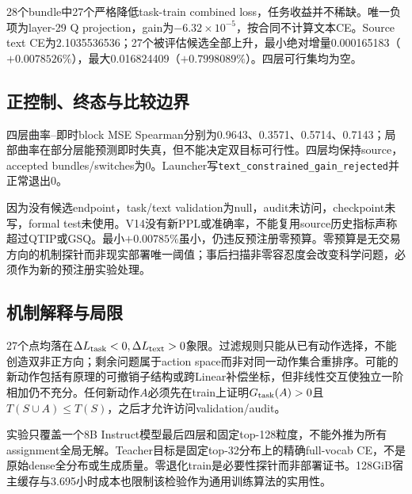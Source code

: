 28个bundle中27个严格降低task-train combined loss，任务收益并不稀缺。唯一负项为layer-29 Q projection，gain为$-6.32\times10^{-5}$，按合同不计算文本CE。Source text CE为2.1035536536；27个被评估候选全部上升，最小绝对增量0.000165183（$+0.0078526\%$），最大0.016824409（$+0.7998089\%$）。四层可行集均为空。

\subsection{正控制、终态与比较边界}

四层曲率--即时block MSE Spearman分别为0.9643、0.3571、0.5714、0.7143；局部曲率在部分层能预测即时失真，但不能决定双目标可行性。四层均保持source，accepted bundles/switches为0。Launcher写\texttt{text\_constrained\_gain\_rejected}并正常退出0。

因为没有候选endpoint，task/text validation为null，audit未访问，checkpoint未写，formal test未使用。V14没有新PPL或准确率，不能复用source历史指标声称超过QTIP或GSQ。最小$+0.00785\%$虽小，仍违反预注册零预算。零预算是无交易方向的机制探针而非现实部署唯一阈值；事后扫描非零容忍度会改变科学问题，必须作为新的预注册实验处理。

\subsection{机制解释与局限}

27个点均落在$\Delta L_{\rm task}<0,\Delta L_{\rm text}>0$象限。过滤规则只能从已有动作选择，不能创造双非正方向；剩余问题属于action space而非对同一动作集合重排序。可能的新动作包括有原理的可撤销子结构或跨Linear补偿坐标，但非线性交互使独立一阶相加仍不充分。任何新动作$A$必须先在train上证明$G_{\rm task}(A)>0$且$T(S\cup A)\le T(S)$，之后才允许访问validation/audit。

实验只覆盖一个8B Instruct模型最后四层和固定top-128粒度，不能外推为所有assignment全局无解。Teacher目标是固定top-32分布上的精确full-vocab CE，不是原始dense全分布或生成质量。零退化train是必要性探针而非部署证书。128GiB宿主缓存与3.695小时成本也限制该检验作为通用训练算法的实用性。
